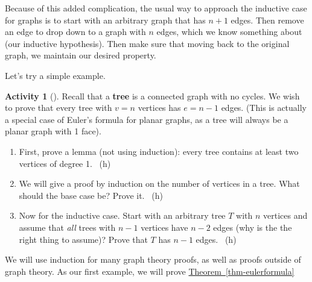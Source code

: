 \documentclass[10pt,]{book}
\newcommand{\terminology}[1]{\textbf{#1}}
\theoremstyle{plain}
\theoremstyle{definition}
\theoremstyle{definition}
\theoremstyle{definition}
\newtheorem{activity}[project]{Activity}
\numberwithin{equation}{chapter}
\begin{document}
\par
\hypertarget{p-238}{}%
Because of this added complication, the usual way to approach the inductive case for graphs is to start with an arbitrary graph that has \(n+1\) edges.  Then remove an edge to drop down to a graph with \(n\) edges, which we know something about (our inductive hypothesis).  Then make sure that moving back to the original graph, we maintain our desired property.%
\par
\hypertarget{p-239}{}%
Let's try a simple example.%
\begin{activity}[]\label{activity-18}
\hypertarget{p-240}{}%
Recall that a \terminology{tree} is a connected graph with no cycles.  We wish to prove that every tree with \(v = n\) vertices has \(e = n-1\) edges.  (This is actually a special case of Euler's formula for planar graphs, as a tree will always be a planar graph with 1 face).%
\begin{enumerate}[font=\bfseries,label=(\alph*),ref=\alph*]
\item\label{task-26} \hypertarget{p-241}{}%
First, prove a lemma (not using induction): every tree contains at least two vertices of degree 1.%
~{\tiny (h)}\item\label{task-27} \hypertarget{p-243}{}%
We will give a proof by induction on the number of vertices in a tree.  What should the base case be?  Prove it.%
~{\tiny (h)}\item\label{task-28} \hypertarget{p-245}{}%
Now for the inductive case.  Start with an arbitrary tree \(T\) with \(n\) vertices and assume that \emph{all} trees with \(n-1\) vertices have \(n-2\) edges (why is the the right thing to assume)?  Prove that \(T\) has \(n-1\) edges.%
~{\tiny (h)}\end{enumerate}
\end{activity}
\hypertarget{p-247}{}%
We will use induction for many graph theory proofs, as well as proofs outside of graph theory.  As our first example, we will prove \hyperref[thm-eulerformula]{Theorem~\ref{thm-eulerformula}}%
\typeout{************************************************}
\typeout{************************************************}
\end{document}
